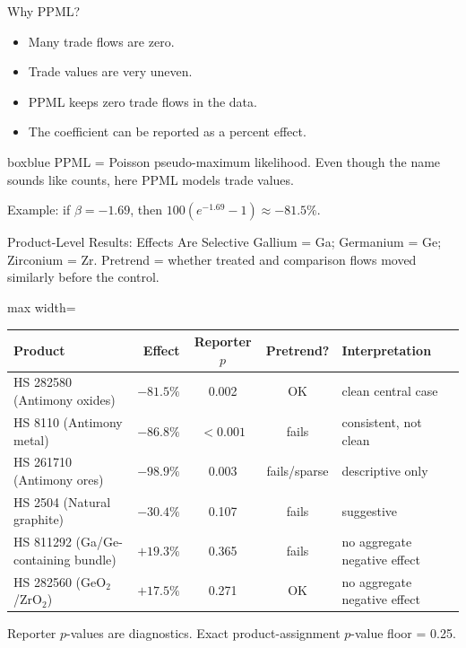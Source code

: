 \documentclass[aspectratio=169,11pt]{beamer}
\renewcommand{\arraystretch}{1.18}
\newcommand{\plainbox}[2]{%
  \begin{beamercolorbox}[rounded=true,sep=0.75em,wd=\textwidth]{#1}
    #2
  \end{beamercolorbox}
}
\begin{document}
\begin{frame}{Why PPML?}
  \large
  \begin{itemize}
    \item Many trade flows are zero.
    \item Trade values are very uneven.
    \item PPML keeps zero trade flows in the data.
    \item The coefficient can be reported as a percent effect.
  \end{itemize}

  \vspace{0.35cm}
  \plainbox{boxblue}{%
    \large PPML = Poisson pseudo-maximum likelihood. Even though the name sounds like counts, here PPML models trade values.
  }

  \vspace{0.25cm}
  \large
  Example: if \(\beta=-1.69\), then \(100(e^{-1.69}-1)\approx -81.5\%\).
\end{frame}

\begin{frame}{Product-Level Results: Effects Are Selective}
  \scriptsize
  Gallium = Ga; Germanium = Ge; Zirconium = Zr. Pretrend = whether treated and comparison flows moved similarly before the control.

  \vspace{0.08cm}
  \renewcommand{\arraystretch}{1.06}
  \begin{adjustbox}{max width=\textwidth}
  \begin{tabular}{p{}rccp{}}
    \toprule
    Product & Effect & Reporter \(p\) & Pretrend? & Interpretation \\
    \midrule
    HS 282580 (Antimony oxides) & \(-81.5\%\) & 0.002 & OK & clean central case \\
    HS 8110 (Antimony metal) & \(-86.8\%\) & \(<0.001\) & fails & consistent, not clean \\
    HS 261710 (Antimony ores) & \(-98.9\%\) & 0.003 & fails/sparse & descriptive only \\
    HS 2504 (Natural graphite) & \(-30.4\%\) & 0.107 & fails & suggestive \\
    HS 811292 (Ga/Ge-containing bundle) & \(+19.3\%\) & 0.365 & fails & no aggregate negative effect \\
    HS 282560 (GeO$_2$/ZrO$_2$) & \(+17.5\%\) & 0.271 & OK & no aggregate negative effect \\
    \bottomrule
  \end{tabular}
  \end{adjustbox}
  \renewcommand{\arraystretch}{1.18}

  \vspace{0.15cm}
  \scriptsize
  Reporter \(p\)-values are diagnostics. Exact product-assignment \(p\)-value floor = 0.25.
\end{frame}
\end{document}
